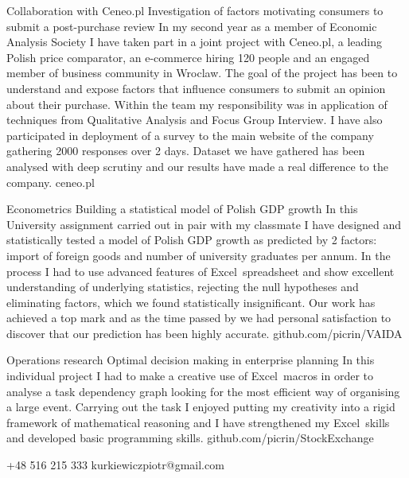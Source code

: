 \documentclass{piotrcv}
\begin{document}
\begin{eventlist}

\item{Collaboration with Ceneo.pl}
     {Investigation of factors motivating consumers to submit a post-purchase review}
     {In my second year as a member of Economic Analysis Society I have taken part in a joint project with Ceneo.pl, a leading Polish price comparator, an e-commerce hiring 120 people and an engaged member of business community in Wroclaw. The goal of the project has been to understand and expose factors that influence consumers to submit an opinion about their purchase. Within the team my responsibility was in application of techniques from Qualitative Analysis and Focus Group Interview. I have also participated in deployment of a survey to the main website of the company gathering 2000 responses over 2 days. Dataset we have gathered has been analysed with deep scrutiny and our results have made a real difference to the company.}
     {ceneo.pl}

\item{Econometrics}
     {Building a statistical model of Polish GDP growth}
     {In this University assignment carried out in pair with my classmate I have designed and statistically tested a model of Polish GDP growth as predicted by 2 factors: import of foreign goods and number of university graduates per annum. In the process I had to use advanced features of Excel\textregistered\ spreadsheet and show excellent understanding of underlying statistics, rejecting the null hypotheses and eliminating factors, which we found statistically insignificant. Our work has achieved a top mark and as the time passed by we had personal satisfaction to discover that our prediction has been highly accurate.}
     {github.com/picrin/VAIDA}

\item{Operations research}
     {Optimal decision making in enterprise planning}
     {In this individual project I had to make a creative use of Excel\textregistered\ macros in order to analyse a task dependency graph looking for the most efficient way of organising a large event. Carrying out the task I enjoyed putting my creativity into a rigid framework of mathematical reasoning and I have strengthened my Excel\textregistered\ skills and developed basic programming skills.}
     {github.com/picrin/StockExchange}

\end{eventlist}

    {+48 516 215 333}
    {kurkiewiczpiotr@gmail.com}
\end{document}

